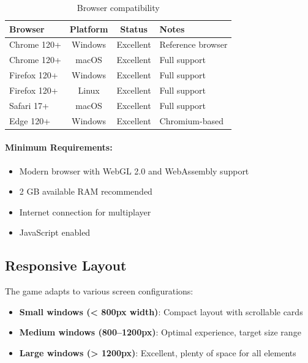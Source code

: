 \begin{table}[htbp]
    \centering
    \caption{Browser compatibility}
    \label{tab:browser-compat}
    \begin{tabular}{@{}lccl@{}}
        \toprule
        \textbf{Browser} & \textbf{Platform} & \textbf{Status} & \textbf{Notes}    \\
        \midrule
        Chrome 120+      & Windows           & Excellent       & Reference browser \\
        Chrome 120+      & macOS             & Excellent       & Full support      \\
        Firefox 120+     & Windows           & Excellent       & Full support      \\
        Firefox 120+     & Linux             & Excellent       & Full support      \\
        Safari 17+       & macOS             & Excellent       & Full support      \\
        Edge 120+        & Windows           & Excellent       & Chromium-based    \\
        \bottomrule
    \end{tabular}
\end{table}

\paragraph*{Minimum Requirements:}

\begin{itemize}
    \item Modern browser with WebGL 2.0 and WebAssembly support
    \item 2 GB available RAM recommended
    \item Internet connection for multiplayer
    \item JavaScript enabled
\end{itemize}

\subsection{Responsive Layout}
\label{subsec:responsive-layout}

The game adapts to various screen configurations:

\begin{itemize}
    \item \textbf{Small windows (< 800px width)}: Compact layout with scrollable cards
    \item \textbf{Medium windows (800--1200px)}: Optimal experience, target size range
    \item \textbf{Large windows (> 1200px)}: Excellent, plenty of space for all elements
\end{itemize}


